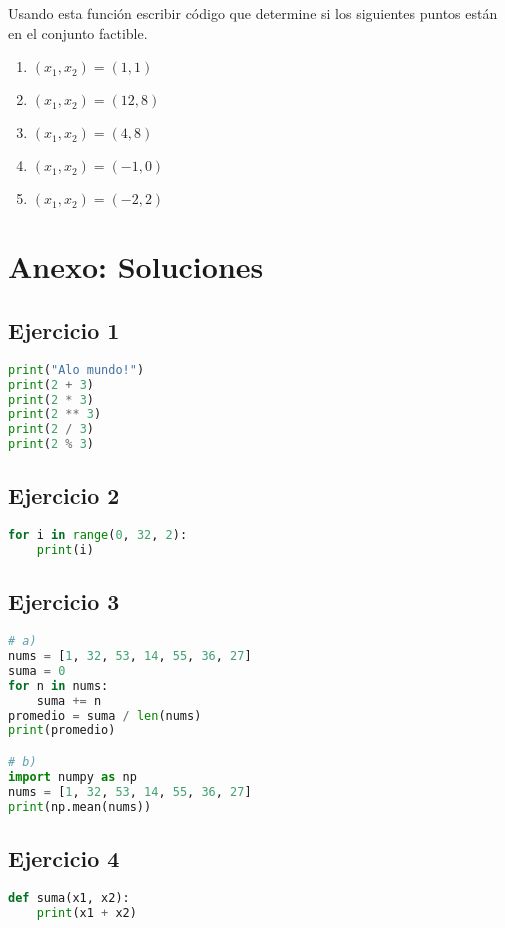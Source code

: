 \documentclass[12pt]{article}
\begin{document}
Usando esta función escribir código que determine si los siguientes puntos están en el conjunto factible.
\begin{enumerate}[label=\alph*)]
    \item $(x_1,x_2) = (1,1)$
    \item $(x_1,x_2) = (12,8)$
    \item $(x_1,x_2) = (4,8)$
    \item $(x_1,x_2) = (-1,0)$
    \item $(x_1,x_2) = (-2,2)$
\end{enumerate}

\newpage

\section{Anexo: Soluciones}

\subsection{Ejercicio 1}
\begin{lstlisting}[language=Python]
print("Alo mundo!")
print(2 + 3)
print(2 * 3)
print(2 ** 3)
print(2 / 3)
print(2 % 3)
\end{lstlisting}

\subsection{Ejercicio 2}
\begin{lstlisting}[language=Python]
for i in range(0, 32, 2):
    print(i)
\end{lstlisting}

\subsection{Ejercicio 3}
\begin{lstlisting}[language=Python]
# a)
nums = [1, 32, 53, 14, 55, 36, 27]
suma = 0
for n in nums:
    suma += n
promedio = suma / len(nums)
print(promedio)

# b)
import numpy as np
nums = [1, 32, 53, 14, 55, 36, 27]
print(np.mean(nums))
\end{lstlisting}

\subsection{Ejercicio 4}
\begin{lstlisting}[language=Python]
def suma(x1, x2):
    print(x1 + x2)
\end{lstlisting}
\end{document}
